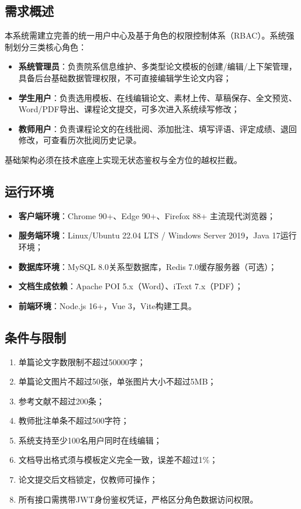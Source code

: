 \documentclass{../template/softeng}
\begin{document}
	\subsection{需求概述}
	本系统需建立完善的统一用户中心及基于角色的权限控制体系（RBAC）。系统强制划分三类核心角色：

	\begin{itemize}
		\item \textbf{系统管理员}：负责院系信息维护、多类型论文模板的创建/编辑/上下架管理，具备后台基础数据管理权限，不可直接编辑学生论文内容；
		\item \textbf{学生用户}：负责选用模板、在线编辑论文、素材上传、草稿保存、全文预览、Word/PDF导出、课程论文提交，可多次进入系统续写修改；
		\item \textbf{教师用户}：负责课程论文的在线批阅、添加批注、填写评语、评定成绩、退回修改，可查看历次批阅历史记录。
	\end{itemize}

	基础架构必须在技术底座上实现无状态鉴权与全方位的越权拦截。

	\subsection{运行环境}
	\begin{itemize}
		\item \textbf{客户端环境}：Chrome 90+、Edge 90+、Firefox 88+ 主流现代浏览器；
		\item \textbf{服务端环境}：Linux/Ubuntu 22.04 LTS / Windows Server 2019，Java 17运行环境；
		\item \textbf{数据库环境}：MySQL 8.0关系型数据库，Redis 7.0缓存服务器（可选）；
		\item \textbf{文档生成依赖}：Apache POI 5.x（Word）、iText 7.x（PDF）；
		\item \textbf{前端环境}：Node.js 16+，Vue 3，Vite构建工具。
	\end{itemize}

	\subsection{条件与限制}
	\begin{enumerate}
		\item 单篇论文字数限制不超过50000字；
		\item 单篇论文图片不超过50张，单张图片大小不超过5MB；
		\item 参考文献不超过200条；
		\item 教师批注单条不超过500字符；
		\item 系统支持至少100名用户同时在线编辑；
		\item 文档导出格式须与模板定义完全一致，误差不超过1\%；
		\item 论文提交后文档锁定，仅教师可操作；
		\item 所有接口需携带JWT身份鉴权凭证，严格区分角色数据访问权限。
	\end{enumerate}
\end{document}
